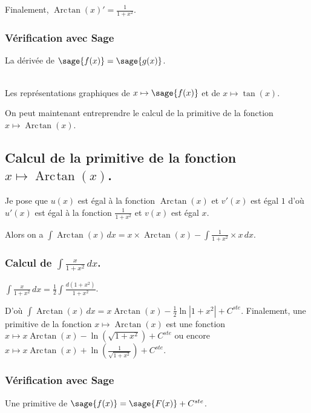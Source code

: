 \documentclass[a4paper,landscape,17pt]{extreport} %
\renewcommand{\arctan}{\mathop{\mathrm{Arc\mspace{2mu}tan}}}
\begin{document}
Finalement, $\arctan(x)' = \frac{1}{1+x^2}$.

\subsubsection*{Vérification avec Sage}


La dérivée de $\sage{f(x)} = \sage{g(x)} $.


\begin{center}
\\
Les représentations graphiques de $x \mapsto \sage{f(x)} $ et de $x\mapsto \tan(x)$.
\end{center}


On peut maintenant entreprendre le calcul de la primitive de la  fonction  $x \mapsto \arctan(x) $.


\subsection{Calcul de la primitive de la fonction  $x \mapsto \arctan(x) $.}


Je pose que $u(x)$  est égal à la fonction $\arctan(x)$ et $v'(x)$ est égal $1$  d'où $u'(x)$  est égal à la fonction $ \frac{1}{1+ x^2} $ et $v(x)$ est égal $x$.

Alors on a $\int \arctan(x) \, dx = x \times \arctan(x) -\int \frac{1}{1+x^2} \times x \, dx $.

\subsubsection{Calcul de $\int \frac{x}{1+ x^2} \, dx $.}

$\int \frac{x}{1+ x^2} \, dx = \frac{1}{2} \int \frac{d(1+x^2)}{1+ x^2} $.

D'où $\int \arctan(x) \, dx = x \arctan(x) - \frac{1}{2} \ln \left| 1+ x^2 \right| + C^{ste} $. 
Finalement, une primitive de la fonction $x \mapsto \arctan(x) $ est une fonction $x \mapsto x \arctan(x) -\ln\left( \sqrt{1+ x^2}\right) + C^{ste} $ ou encore $x \mapsto x \arctan(x) +\ln\left( \frac{1}{\sqrt{1+ x^2}}\right) + C^{ste} $.


\subsubsection{Vérification avec Sage}

Une primitive de $\sage{f(x)} = \sage{F(x)} + C^{ste}$.
\end{document}
